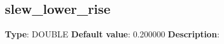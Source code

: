 \subsection*{slew_lower_rise}
\textbf{Type}: DOUBLE\newline
\textbf{Default value}: 0.200000\newline
\textbf{Description}: